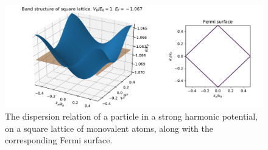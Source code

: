 \documentclass[main.tex]{subfiles}
\begin{document}
	\begin{figure}[h]
		\centering
		\includegraphics[width=\linewidth]{figures/band_structure_strong.pdf}
		\caption{The dispersion relation of a particle in a strong harmonic potential, on a square lattice of monovalent atoms, along with the corresponding Fermi surface.}
		\label{fig:band_structure_strong}
	\end{figure}
\end{document}
